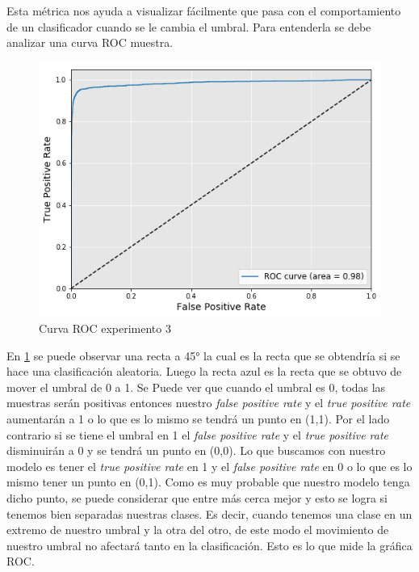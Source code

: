 \par Esta métrica nos ayuda a visualizar fácilmente que pasa con el comportamiento de un clasificador cuando se le cambia el umbral. Para entenderla se debe analizar una curva ROC muestra.

\begin{figure}[H]
    \centering
    \includegraphics[width=\linewidth]{imagenes/ROC_Exp3_1.png}
    \caption{Curva ROC experimento 3}
    \label{fig:ROCMuestra}
\end{figure}

\par En \ref{fig:ROCMuestra} se puede observar una recta a \ang{45} la cual es la recta que se obtendría si se hace una clasificación aleatoria. Luego la recta azul es la recta que se obtuvo de mover el umbral de 0 a 1. Se Puede ver que cuando el umbral es 0, todas las muestras serán positivas entonces nuestro \textit{false positive rate} y el  \textit{true positive rate} aumentarán a 1 o lo que es lo mismo se tendrá un punto en (1,1). Por el lado contrario si se tiene el umbral en 1 el \textit{false positive rate} y el  \textit{true positive rate} disminuirán a 0 y se tendrá un punto en (0,0). Lo que buscamos con nuestro modelo es tener el \textit{true positive rate} en 1 y el \textit{false positive rate} en 0 o lo que es lo mismo tener un punto en (0,1). Como es muy probable que nuestro modelo tenga dicho punto, se puede considerar que entre más cerca mejor y esto se logra si tenemos bien separadas nuestras clases. Es decir, cuando tenemos una clase en un extremo de nuestro umbral y la otra del otro, de este modo el movimiento de nuestro umbral no afectará tanto en la clasificación. Esto es lo que mide la gráfica ROC.

